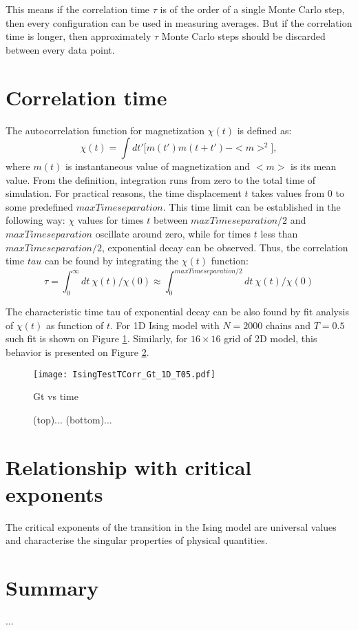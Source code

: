 \documentclass[11pt,a4paper]{article}%
\begin{document}
This means if the correlation time $\tau$ is of the order of a single
Monte Carlo step, then every configuration can be used in measuring
averages. But if the correlation time is longer, then approximately $\tau$ Monte Carlo steps should be discarded between every data point.


\section{Correlation time}
The autocorrelation function for magnetization $\chi(t)$ is defined as:
\begin{equation}
\chi(t) = \int{dt'[m(t')m(t+t')-<m>^2}],
\end{equation}
where $m(t)$ is instantaneous value of magnetization and $<m>$ is its mean value.
From the definition, integration runs from zero to the total time of simulation. 
For practical reasons, the time displacement $t$ takes values from 0 to some predefined $maxTimeseparation$. This time limit can be established in the following way:
$\chi$ values for times $t$ between $maxTimeseparation/2$ and $maxTimeseparation$ oscillate around zero, while for times $t$ less than $maxTimeseparation/2$, exponential decay can be observed. 
Thus, the correlation time $tau$ can be found by integrating the $\chi(t)$ function:
\begin{equation}
\tau = \int_0^{\infty}{dt~ \chi(t)/\chi(0)} \approx \int_0^{maxTimeseparation/2}{dt~ \chi(t)/\chi(0)}
\end{equation}

The characteristic time tau of exponential decay can be also found by fit analysis of 
 $\chi(t)$ as function of $t$. For 1D Ising model with $N=2000$ chains and $T=0.5$ such fit is shown on Figure \ref{gt_1d_t05}. Similarly, for $16\times16$ grid of 2D model, this behavior is presented on Figure \ref{gt_2d}.
     

\begin{figure}[!ht]
\centering
  \texttt{[image: IsingTestTCorr\_Gt\_1D\_T05.pdf]}
  \vspace{-0.05in}
   \caption[]{Gt vs time}   
  \label{gt_1d_t05}
\end{figure}



\begin{figure}[!ht]
\centering
  \hspace{-0.15in}
  \vspace{-0.05in}
   \caption[]{(top)...
   (bottom)...}   
  \label{gt_2d}
\end{figure}



\section{Relationship with critical exponents}
 The critical exponents of the transition in the Ising model are universal values and characterise the singular properties of physical quantities. 

\section{Summary}
...





\end{document}
